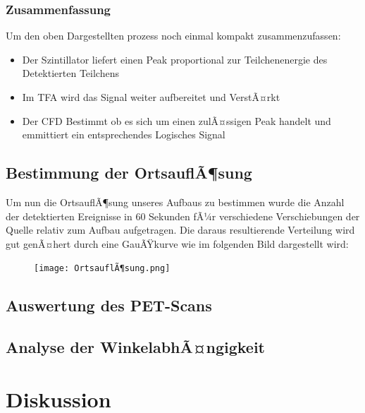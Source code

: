 \documentclass{article}
\begin{document}
                \subsubsection{Zusammenfassung}
                Um den oben Dargestellten prozess noch einmal kompakt zusammenzufassen:
                \begin{itemize}
                    \item Der Szintillator liefert einen Peak proportional zur Teilchenenergie des Detektierten Teilchens
                    \item Im TFA wird das Signal weiter aufbereitet und VerstÃ¤rkt
                    \item Der CFD Bestimmt ob es sich um einen zulÃ¤ssigen Peak handelt und emmittiert ein entsprechendes Logisches Signal
                \end{itemize}

        \subsection{Bestimmung der OrtsauflÃ¶sung}
            Um nun die OrtsauflÃ¶sung unseres Aufbaus zu bestimmen wurde die Anzahl der detektierten Ereignisse in 60 Sekunden
            fÃ¼r verschiedene Verschiebungen der Quelle relativ zum Aufbau aufgetragen. Die daraus resultierende Verteilung wird gut genÃ¤hert durch eine
            GauÃŸkurve wie im folgenden Bild dargestellt wird:
            \begin{figure}[H]
                \centering
                \texttt{[image: OrtsauflÃ¶sung.png]}
                \label{Plot der OrtsauflÃ¶sungsmessung}
            \end{figure}


        \subsection{Auswertung des PET-Scans}

        \subsection{Analyse der WinkelabhÃ¤ngigkeit}


    \section{Diskussion}
\end{document}
